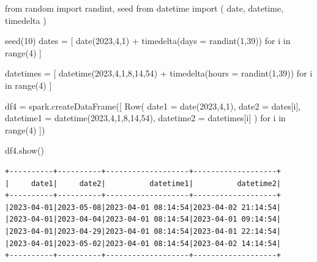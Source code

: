 \documentclass[
  11pt,
  letterpaper,
  DIV=11,
  numbers=noendperiod]{scrreprt}
\newenvironment{Shaded}{\begin{snugshade}}{\end{snugshade}}
\newcommand{\BuiltInTok}[1]{\textcolor[rgb]{0.00,0.23,0.31}{#1}}
\newcommand{\ControlFlowTok}[1]{\textcolor[rgb]{0.00,0.23,0.31}{#1}}
\newcommand{\DecValTok}[1]{\textcolor[rgb]{0.68,0.00,0.00}{#1}}
\newcommand{\ImportTok}[1]{\textcolor[rgb]{0.00,0.46,0.62}{#1}}
\newcommand{\KeywordTok}[1]{\textcolor[rgb]{0.00,0.23,0.31}{#1}}
\newcommand{\NormalTok}[1]{\textcolor[rgb]{0.00,0.23,0.31}{#1}}
\newcommand{\OperatorTok}[1]{\textcolor[rgb]{0.37,0.37,0.37}{#1}}
\begin{document}
\begin{Shaded}
\begin{Highlighting}[]
\ImportTok{from}\NormalTok{ random }\ImportTok{import}\NormalTok{ randint, seed}
\ImportTok{from}\NormalTok{ datetime }\ImportTok{import}\NormalTok{ (}
\NormalTok{    date,}
\NormalTok{    datetime,}
\NormalTok{    timedelta}
\NormalTok{)}

\NormalTok{seed(}\DecValTok{10}\NormalTok{)}
\NormalTok{dates }\OperatorTok{=}\NormalTok{ [}
\NormalTok{    date(}\DecValTok{2023}\NormalTok{,}\DecValTok{4}\NormalTok{,}\DecValTok{1}\NormalTok{) }\OperatorTok{+}\NormalTok{ timedelta(days }\OperatorTok{=}\NormalTok{ randint(}\DecValTok{1}\NormalTok{,}\DecValTok{39}\NormalTok{))}
    \ControlFlowTok{for}\NormalTok{ i }\KeywordTok{in} \BuiltInTok{range}\NormalTok{(}\DecValTok{4}\NormalTok{)}
\NormalTok{]}

\NormalTok{datetimes }\OperatorTok{=}\NormalTok{ [}
\NormalTok{    datetime(}\DecValTok{2023}\NormalTok{,}\DecValTok{4}\NormalTok{,}\DecValTok{1}\NormalTok{,}\DecValTok{8}\NormalTok{,}\DecValTok{14}\NormalTok{,}\DecValTok{54}\NormalTok{) }\OperatorTok{+}\NormalTok{ timedelta(hours }\OperatorTok{=}\NormalTok{ randint(}\DecValTok{1}\NormalTok{,}\DecValTok{39}\NormalTok{))}
    \ControlFlowTok{for}\NormalTok{ i }\KeywordTok{in} \BuiltInTok{range}\NormalTok{(}\DecValTok{4}\NormalTok{)}
\NormalTok{]}


\NormalTok{df4 }\OperatorTok{=}\NormalTok{ spark.createDataFrame([}
\NormalTok{    Row(}
\NormalTok{        date1 }\OperatorTok{=}\NormalTok{ date(}\DecValTok{2023}\NormalTok{,}\DecValTok{4}\NormalTok{,}\DecValTok{1}\NormalTok{),}
\NormalTok{        date2 }\OperatorTok{=}\NormalTok{ dates[i],}
\NormalTok{        datetime1 }\OperatorTok{=}\NormalTok{ datetime(}\DecValTok{2023}\NormalTok{,}\DecValTok{4}\NormalTok{,}\DecValTok{1}\NormalTok{,}\DecValTok{8}\NormalTok{,}\DecValTok{14}\NormalTok{,}\DecValTok{54}\NormalTok{),}
\NormalTok{        datetime2 }\OperatorTok{=}\NormalTok{ datetimes[i]}
\NormalTok{    )}
    \ControlFlowTok{for}\NormalTok{ i }\KeywordTok{in} \BuiltInTok{range}\NormalTok{(}\DecValTok{4}\NormalTok{)}
\NormalTok{])}

\NormalTok{df4.show()}
\end{Highlighting}
\end{Shaded}

\begin{verbatim}
+----------+----------+-------------------+-------------------+
|     date1|     date2|          datetime1|          datetime2|
+----------+----------+-------------------+-------------------+
|2023-04-01|2023-05-08|2023-04-01 08:14:54|2023-04-02 21:14:54|
|2023-04-01|2023-04-04|2023-04-01 08:14:54|2023-04-01 09:14:54|
|2023-04-01|2023-04-29|2023-04-01 08:14:54|2023-04-01 22:14:54|
|2023-04-01|2023-05-02|2023-04-01 08:14:54|2023-04-02 14:14:54|
+----------+----------+-------------------+-------------------+
\end{verbatim}
\end{document}
